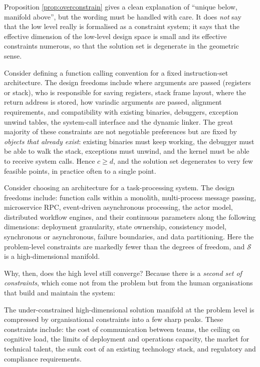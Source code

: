 Proposition \ref{prop:overconstrain} gives a clean explanation of ``unique below, manifold
above'', but the wording must be handled with care. It does \emph{not} say that the low
level really is formalised as a constraint system; it says that the effective dimension of
the low-level design space is small and its effective constraints numerous, so that the
solution set is degenerate in the geometric sense.

\begin{example}\label{ex:abi}
Consider defining a function calling convention for a fixed instruction-set architecture.
The design freedoms include where arguments are passed (registers or stack), who is
responsible for saving registers, stack frame layout, where the return address is stored,
how variadic arguments are passed, alignment requirements, and compatibility with existing
binaries, debuggers, exception unwind tables, the system-call interface and the dynamic
linker. The great majority of these constraints are not negotiable preferences but are
fixed by \emph{objects that already exist}: existing binaries must keep working, the
debugger must be able to walk the stack, exceptions must unwind, and the kernel must be
able to receive system calls. Hence $c \ge d$, and the solution set degenerates to very few
feasible points, in practice often to a single point.
\end{example}

\begin{example}\label{ex:arch}
Consider choosing an architecture for a task-processing system. The design freedoms
include: function calls within a monolith, multi-process message passing, microservice RPC,
event-driven asynchronous processing, the actor model, distributed workflow engines, and
their continuous parameters along the following dimensions: deployment granularity, state
ownership, consistency model, synchronous or asynchronous, failure boundaries, and data
partitioning. Here the problem-level constraints are markedly fewer than the degrees of
freedom, and $\mathcal{S}$ is a high-dimensional manifold.
\end{example}

Why, then, does the high level still converge? Because there is a \emph{second set of
constraints}, which come not from the problem but from the human organisations that build
and maintain the system:

\begin{principle}\label{pr:org}
The under-constrained high-dimensional solution manifold at the problem level is compressed
by organisational constraints into a few sharp peaks. These constraints include: the cost of
communication between teams, the ceiling on cognitive load, the limits of deployment and
operations capacity, the market for technical talent, the sunk cost of an existing
technology stack, and regulatory and compliance requirements.
\end{principle}

